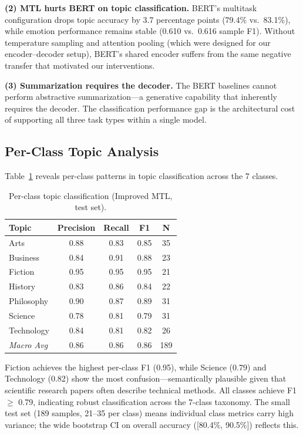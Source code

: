 \documentclass[11pt]{article}
\begin{document}
\textbf{(2) MTL hurts BERT on topic classification.} BERT's multitask configuration drops topic accuracy by 3.7 percentage points (79.4\% vs.\ 83.1\%), while emotion performance remains stable (0.610 vs.\ 0.616 sample F1). Without temperature sampling and attention pooling (which were designed for our encoder--decoder setup), BERT's shared encoder suffers from the same negative transfer that motivated our interventions.

\textbf{(3) Summarization requires the decoder.} The BERT baselines cannot perform abstractive summarization---a generative capability that inherently requires the decoder. The classification performance gap is the architectural cost of supporting all three task types within a single model.

\subsection{Per-Class Topic Analysis}

Table~\ref{tab:topic_breakdown} reveals per-class patterns in topic classification across the 7 classes.

\begin{table}[t]
\centering
\caption{Per-class topic classification (Improved MTL, test set).}
\label{tab:topic_breakdown}
\small
\begin{tabular}{lcccc}
\toprule
\textbf{Topic} & \textbf{Precision} & \textbf{Recall} & \textbf{F1} & \textbf{N} \\
\midrule
Arts & 0.88 & 0.83 & 0.85 & 35 \\
Business & 0.84 & 0.91 & 0.88 & 23 \\
Fiction & 0.95 & 0.95 & 0.95 & 21 \\
History & 0.83 & 0.86 & 0.84 & 22 \\
Philosophy & 0.90 & 0.87 & 0.89 & 31 \\
Science & 0.78 & 0.81 & 0.79 & 31 \\
Technology & 0.84 & 0.81 & 0.82 & 26 \\
\midrule
\textit{Macro Avg} & 0.86 & 0.86 & 0.86 & 189 \\
\bottomrule
\end{tabular}
\end{table}

Fiction achieves the highest per-class F1 (0.95), while Science (0.79) and Technology (0.82) show the most confusion---semantically plausible given that scientific research papers often describe technical methods. All classes achieve F1 $\geq$ 0.79, indicating robust classification across the 7-class taxonomy. The small test set (189 samples, 21--35 per class) means individual class metrics carry high variance; the wide bootstrap CI on overall accuracy ([80.4\%, 90.5\%]) reflects this.
\end{document}
